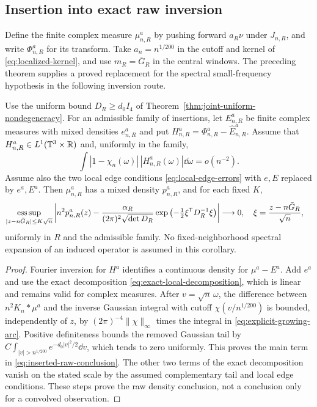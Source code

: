 \subsection{Insertion into exact raw inversion}
Define the finite complex measure $\mu^a_{n,R}$ by pushing forward
$a_R\nu$ under $J_{n,R}$, and write $\Phi^a_{n,R}$ for its transform.
Take $a_n=n^{1/200}$ in the cutoff and kernel of
\eqref{eq:localized-kernel}, and use $m_R=\bar G_R$ in the central
windows. The preceding theorem supplies a proved replacement for the
spectral small-frequency hypothesis in the following inversion route.

\begin{corollary}
\label{cor:raw-from-growing-arc}
Use the uniform bound $D_R\ge d_0 I_4$ of
Theorem~\ref{thm:joint-uniform-nondegeneracy}.
For an admissible family of insertions, let $E^a_{n,R}$ be finite complex
measures with mixed densities $e^a_{n,R}$ and put
$H^a_{n,R}=\Phi^a_{n,R}-\widehat E^a_{n,R}$. Assume that
$H^a_{n,R}\in L^1(\mathbb T^3\times\mathbb R)$ and, uniformly in the family,
\begin{equation}\label{eq:new-complementary-tail}
 \int |1-\chi_n(\omega)|\,|H^a_{n,R}(\omega)|\dd\omega=o(n^{-2}).
\end{equation}
Assume also the two local edge conditions
\eqref{eq:local-edge-errors} with $e,E$ replaced by $e^a,E^a$.
Then $\mu^a_{n,R}$ has a mixed density $p^a_{n,R}$, and for each fixed
$K$,
\begin{align}
 \mathop{\rm ess\,sup}_{|z-n\bar G_R|\le K\sqrt n}
 \left|n^2p^a_{n,R}(z)
 -\frac{\alpha_R}{(2\pi)^2\sqrt{\det D_R}}
   \exp\left(-\tfrac12\xi^{\mathsf T}D_R^{-1}\xi\right)\right|
 &\longrightarrow0,
 \quad \xi=\frac{z-n\bar G_R}{\sqrt n},
 \label{eq:inserted-raw-conclusion}
\end{align}
uniformly in $R$ and the admissible family. No fixed-neighborhood
spectral expansion of an induced operator is assumed in this corollary.
\end{corollary}
\begin{proof}
Fourier inversion for $H^a$ identifies a continuous density for
$\mu^a-E^a$. Add $e^a$ and use the exact decomposition
\eqref{eq:exact-local-decomposition}, which is linear and remains valid
for complex measures. After $v=\sqrt n\,\omega$, the difference between
$n^2K_n*\mu^a$ and the inverse Gaussian integral with cutoff
$\chi(v/n^{1/200})$ is bounded, independently of $z$, by
$(2\pi)^{-4}\|\chi\|_\infty$ times the integral in
\eqref{eq:explicit-growing-arc}. Positive definiteness bounds the
removed Gaussian tail by
$C\int_{|v|>n^{1/200}}e^{-d_0|v|^2/2}\dd v$, which tends to zero
uniformly. This proves the main term in
\eqref{eq:inserted-raw-conclusion}. The other two terms of the exact
decomposition vanish on the stated scale by the assumed complementary
tail and local edge conditions. These steps prove the raw density
conclusion, not a conclusion only for a convolved observation.
\end{proof}

